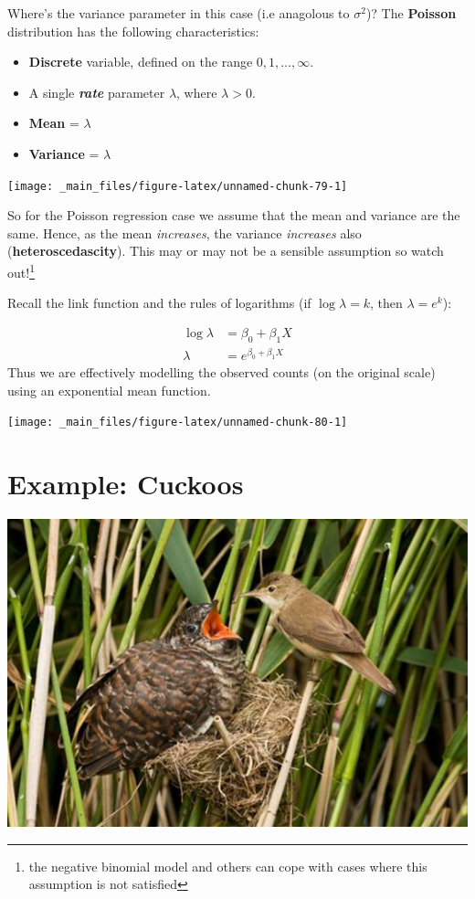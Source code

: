 \documentclass[]{book}
\providecommand{\tightlist}{%
  \setlength{\itemsep}{0pt}\setlength{\parskip}{0pt}}
\let\rmarkdownfootnote\footnote%
\def\footnote{\protect\rmarkdownfootnote}
\theoremstyle{definition}
\theoremstyle{definition}
\theoremstyle{definition}
\theoremstyle{remark}
\begin{document}
Where's the variance parameter in this case (i.e anagolous to
\(\sigma^2\))? The \textbf{Poisson} distribution has the following
characteristics:

\begin{itemize}
\tightlist
\item
  \textbf{Discrete} variable, defined on the range
  \(0, 1, \dots, \infty\).
\item
  A single \textbf{\emph{rate}} parameter \(\lambda\), where
  \(\lambda > 0\).
\item
  \textbf{Mean} = \(\lambda\)\\
\item
  \textbf{Variance} = \(\lambda\)
\end{itemize}

\begin{center}\texttt{[image: \_main\_files/figure-latex/unnamed-chunk-79-1]} \end{center}

So for the Poisson regression case we assume that the mean and variance
are the same. Hence, as the mean \emph{increases}, the variance
\emph{increases} also (\textbf{heteroscedascity}). This may or may not
be a sensible assumption so watch out!\footnote{the negative binomial
  model and others can cope with cases where this assumption is not
  satisfied}

Recall the link function and the rules of logarithms (if
\(\log{\lambda} = k\), then \(\lambda = e^k\)):

\[
\begin{aligned}
\log{\lambda} & = \beta_0 + \beta_1X \\
\lambda & = e^{\beta_0 + \beta_1X }
\end{aligned}
\] Thus we are effectively modelling the observed counts (on the
original scale) using an exponential mean function.

\begin{center}\texttt{[image: \_main\_files/figure-latex/unnamed-chunk-80-1]} \end{center}

\section{Example: Cuckoos}\label{example-cuckoos}

\begin{center}\includegraphics[width=0.75\linewidth]{_img/03-cuckoo} \end{center}
\end{document}
